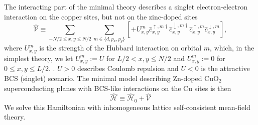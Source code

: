 The interacting part of the minimal theory describes a singlet electron-electron interaction on the copper sites, but not on the zinc-doped sites
\begin{equation}
    \hat{\mathcal{V}}\equiv
    \sum_{-N/2\leq x,y\leq N/2}\sum_{m\in\{d,p_x,p_y\}}\left[
    +U^m_{x,y}  \hat{c}^{ \uparrow,m \dagger}_{ x,y }\hat{c}^{ \downarrow,m \dagger}_{ x,y } \hat{c}^{ \uparrow,m }_{ x,y }\hat{c}^{ \downarrow,m }_{ x,y }\right],
\end{equation}
where $U^m_{x,y}$ is the strength of the Hubbard interaction on orbital $m$, which, in the 
simplest theory, we let $U^m_{x,y}:= U$ for $L/2 < x,y \leq N/2$ and $U^m_{x,y}:= 0$ for $0\leq x,y \leq L/2$.
. $U>0$ describes Coulomb repulsion and $U<0$ is the attractive BCS (singlet) scenario.
The minimal model describing Zn-doped CuO$_2$ superconducting planes with BCS-like interactions on the Cu sites is then
\begin{equation}
    \hat{\mathcal{H}}\equiv
    \hat{\mathcal{H}}_0
    +\hat{\mathcal{V}}
\end{equation}
We solve this Hamiltonian with inhomogeneous lattice self-consistent mean-field theory.

